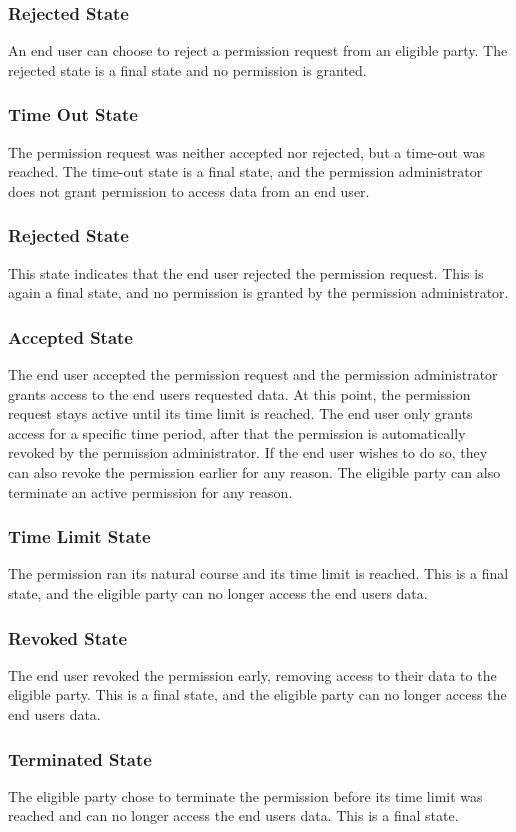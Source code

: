 \subsubsection{Rejected State}
An end user can choose to reject a permission request from an eligible party.
The rejected state is a final state and no permission is granted.

\subsubsection{Time Out State}
The permission request was neither accepted nor rejected, but a time-out was reached.
The time-out state is a final state, and the permission administrator does not grant permission to access data from an end user.

\subsubsection{Rejected State}
This state indicates that the end user rejected the permission request.
This is again a final state, and no permission is granted by the permission administrator.

\subsubsection{Accepted State}
The end user accepted the permission request and the permission administrator grants access to the end users requested data.
At this point, the permission request stays active until its time limit is reached.
The end user only grants access for a specific time period, after that the permission is automatically revoked by the permission administrator.
If the end user wishes to do so, they can also revoke the permission earlier for any reason.
The eligible party can also terminate an active permission for any reason.

\subsubsection{Time Limit State}
The permission ran its natural course and its time limit is reached.
This is a final state, and the eligible party can no longer access the end users data.

\subsubsection{Revoked State}
The end user revoked the permission early, removing access to their data to the eligible party.
This is a final state, and the eligible party can no longer access the end users data.

\subsubsection{Terminated State}\label{subsubsec:terminated-state}
The eligible party chose to terminate the permission before its time limit was reached and can no longer access the end users data.
This is a final state.